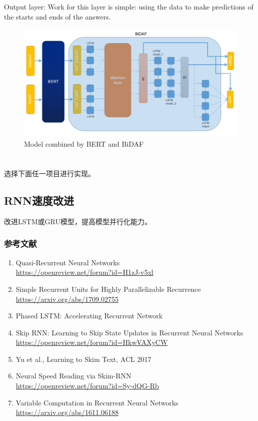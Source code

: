 \documentclass{article}
\begin{document}
Output layer: Work for this layer is simple: using the data to make predictions of the starts and ends of the answers.

\begin{figure}[h]
	\centering
	\includegraphics[scale=0.3 ]{Model.png}
	\caption{Model combined by BERT and BiDAF}
\end{figure}
\section{}

选择下面任一项目进行实现。

\subsection{RNN速度改进}
改进LSTM或GRU模型，提高模型并行化能力。

\subsubsection{参考文献}
\begin{enumerate}
    \item Quasi-Recurrent Neural Networks\\ \url{https://openreview.net/forum?id=H1zJ-v5xl}
    \item Simple Recurrent Units for Highly Parallelizable Recurrence\\ \url{https://arxiv.org/abs/1709.02755}
    \item Phased LSTM: Accelerating Recurrent Network
    \item Skip RNN: Learning to Skip State Updates in Recurrent Neural Networks\\ \url{https://openreview.net/forum?id=HkwVAXyCW}
    \item Yu et al., Learning to Skim Text, ACL 2017
    \item Neural Speed Reading via Skim-RNN\\ \url{https://openreview.net/forum?id=Sy-dQG-Rb}
    \item Variable Computation in Recurrent Neural Networks\\
    \url{https://arxiv.org/abs/1611.06188}
\end{enumerate}
\end{document}

